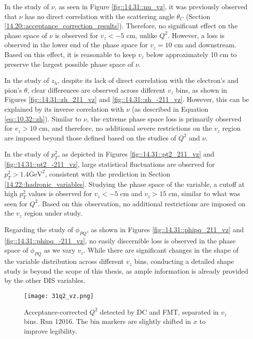     In the study of $\nu$, as seen in Figure \ref{fig::14.31::nu_vz}, it was previously observed that $\nu$ has no direct correlation with the scattering angle $\theta_C$ (Section \ref{14.20::acceptance_correction_results}).
    Therefore, no significant effect on the phase space of $\nu$ is observed for $v_z < -5$ cm, unlike $Q^2$.
    However, a loss is observed in the lower end of the phase space for $v_z = 10$ cm and downstream.
    Based on this effect, it is reasonable to keep $v_z$ below approximately 10 cm to preserve the largest possible phase space of $\nu$.

    In the study of $z_h$, despite its lack of direct correlation with the electron's and pion's $\theta$, clear differences are observed across different $v_z$ bins, as shown in Figures \ref{fig::14.31::zh_211_vz} and \ref{fig::14.31::zh_-211_vz}.
    However, this can be explained by its inverse correlation with $\nu$ (as described in Equation \eqref{eq::10.32::zh}).
    Similar to $\nu$, the extreme phase space loss is primarily observed for $v_z > 10$ cm, and therefore, no additional severe restrictions on the $v_z$ region are imposed beyond those defined based on the studies of $Q^2$ and $\nu$.

    In the study of $p_T^2$, as depicted in Figures \ref{fig::14.31::pt2_211_vz} and \ref{fig::14.31::pt2_-211_vz}, large statistical fluctuations are observed for $p_T^2 > 1.4 \text{GeV}^2$, consistent with the prediction in Section \ref{14.22::hadronic_variables}.
    Studying the phase space of the variable, a cutoff at high $p_T^2$ values is observed for $v_z < -5$ cm and $v_z > 15$ cm, similar to what was seen for $Q^2$.
    Based on this observation, no additional restrictions are imposed on the $v_z$ region under study.

    Regarding the study of $\phi_{PQ}$, as shown in Figures \ref{fig::14.31::phipq_211_vz} and \ref{fig::14.31::phipq_-211_vz}, no easily discernible loss is observed in the phase space of $\phi_{PQ}$ as we vary $v_z$.
    While there are significant changes in the shape of the variable distribution across different $v_z$ bins, conducting a detailed shape study is beyond the scope of this thesis, as ample information is already provided by the other DIS variables.

    \begin{figure}
        \centering
        \texttt{[image: 31q2\_vz.png]}
        \caption[Acceptance-corrected $Q^2$ separated in $v_z$ bins]
        {Acceptance-corrected $Q^2$ detected by DC and FMT, separated in $v_z$ bins.
        Run 12016.
        The bin markers are slightly shifted in $x$ to improve legibility.}
        \label{fig::14.31::q2_vz}
    \end{figure}


